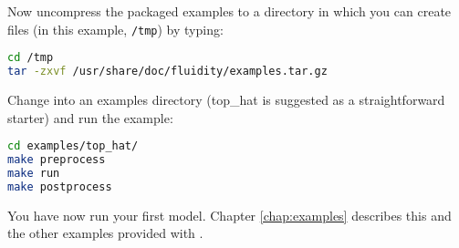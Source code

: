 Now uncompress the packaged examples to a directory in which you can create
files (in this example, \lstinline[language=Bash]+/tmp+) by typing:

\begin{lstlisting}[language=Bash]
cd /tmp
tar -zxvf /usr/share/doc/fluidity/examples.tar.gz
\end{lstlisting}

Change into an examples directory (top\_hat is suggested as a straightforward
starter) and run the example:

\begin{lstlisting}[language=Bash]
cd examples/top_hat/
make preprocess
make run
make postprocess
\end{lstlisting}

You have now run your first \fluidity model. Chapter \ref{chap:examples}
describes this and the other examples provided with \fluidity.
